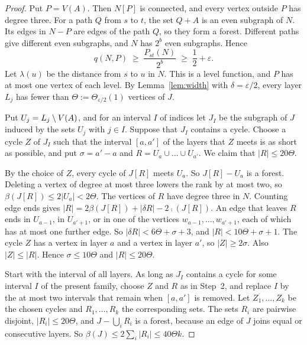 \begin{proof}
 Put $P=V(A)$. Then $N[P]$ is connected, and every vertex
outside $P$ has degree three. For a path $Q$ from $s$ to $t$, the set $Q+A$ is an even subgraph of
$N$. Its edges in $N-P$ are edges of the path $Q$, so they form a forest. Different paths give
different even subgraphs, and $N$ has $2^{b}$ even subgraphs. Hence
\begin{equation}\label{eq:qH}
  q(N,P)\;\ge\;\frac{P_{st}(N)}{2^{b}}\;\ge\;\frac12+\varepsilon .
\end{equation}
Let $\lambda(u)$ be the distance from $s$ to $u$ in $N$. This is a level function, and $P$ has at
most one vertex of each level. By Lemma~\ref{lem:width} with $\delta=\varepsilon/2$, every layer
$L_j$ has fewer than $\Theta:=\Theta_{\varepsilon/2}(1)$ vertices of $J$.

 Put $U_j=L_j\setminus V(A)$, and for an interval $I$ of indices let $J_I$ be
the subgraph of $J$ induced by the sets $U_j$ with $j\in I$. Suppose that $J_I$ contains a cycle.
Choose a cycle $Z$ of $J_I$ such that the interval $[a,a']$ of the layers that $Z$ meets is as
short as possible, and put $\sigma=a'-a$ and $R=U_a\cup\dots\cup U_{a'}$. We claim that
$|R|\le20\Theta$.

By the choice of $Z$, every cycle of $J[R]$ meets $U_a$. So $J[R]-U_a$ is a forest. Deleting a
vertex of degree at most three lowers the rank by at most two, so $\beta(J[R])\le2|U_a|<2\Theta$.
The vertices of $R$ have degree three in $N$. Counting edge ends gives
$|R|=2\beta(J[R])+|\delta R|-2\comp(J[R])$. An edge that leaves $R$ ends in $U_{a-1}$, in
$U_{a'+1}$, or in one of the vertices $w_{a-1},\dots,w_{a'+1}$, each of which has at most one
further edge. So $|\delta R|<6\Theta+\sigma+3$, and $|R|<10\Theta+\sigma+1$. The cycle $Z$ has a vertex in
layer $a$ and a vertex in layer $a'$, so $|Z|\ge2\sigma$. Also $|Z|\le|R|$. Hence
$\sigma\le10\Theta$ and $|R|\le20\Theta$.

 Start with the interval of all layers. As long as $J_I$ contains a
cycle for some interval $I$ of the present family, choose $Z$ and $R$ as in Step~2, and replace $I$
by the at most two intervals that remain when $[a,a']$ is removed. Let $Z_1,\dots,Z_k$ be the
chosen cycles and $R_1,\dots,R_k$ the corresponding sets. The sets $R_i$ are pairwise disjoint,
$|R_i|\le20\Theta$, and $J-\bigcup_iR_i$ is a forest, because an edge of $J$ joins equal or
consecutive layers. So $\beta(J)\le2\sum_i|R_i|\le40\Theta k$.


\end{proof}
